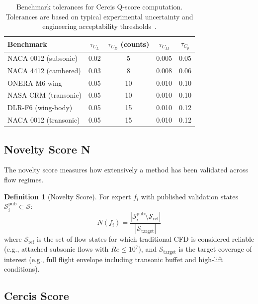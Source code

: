 \documentclass[11pt,a4paper]{article}
\theoremstyle{definition}
\newtheorem{definition}[theorem]{Definition}
\theoremstyle{remark}
\begin{document}
\begin{table}[htbp]
\centering
\caption{Benchmark tolerances for Cercis Q-score computation. Tolerances are based on typical experimental uncertainty and engineering acceptability thresholds~\citep{vassberg2008summary}.}
\label{tab:tolerances}
\begin{tabular}{@{}lcccc@{}}
\toprule
Benchmark & $\tau_{C_L}$ & $\tau_{C_D}$ (counts) & $\tau_{C_M}$ & $\tau_{C_p}$ \\
\midrule
NACA 0012 (subsonic) & 0.02 & 5 & 0.005 & 0.05 \\
NACA 4412 (cambered) & 0.03 & 8 & 0.008 & 0.06 \\
ONERA M6 wing & 0.05 & 10 & 0.010 & 0.10 \\
NASA CRM (transonic) & 0.05 & 10 & 0.010 & 0.10 \\
DLR-F6 (wing-body) & 0.05 & 15 & 0.010 & 0.12 \\
NACA 0012 (transonic) & 0.05 & 15 & 0.010 & 0.12 \\
\bottomrule
\end{tabular}
\end{table}

\subsection{Novelty Score N}

The novelty score measures how extensively a method has been validated across flow regimes.

\begin{definition}[Novelty Score]
For expert $f_i$ with published validation states $\mathcal{S}_i^{\text{pub}} \subset \mathcal{S}$:
\begin{equation}
N(f_i) = \frac{|\mathcal{S}_i^{\text{pub}} \setminus \mathcal{S}_{\text{ref}}|}{|\mathcal{S}_{\text{target}}|}
\label{eq:nscore}
\end{equation}
where $\mathcal{S}_{\text{ref}}$ is the set of flow states for which traditional CFD is considered reliable (e.g., attached subsonic flows with $Re \leq 10^7$), and $\mathcal{S}_{\text{target}}$ is the target coverage of interest (e.g., full flight envelope including transonic buffet and high-lift conditions).
\end{definition}

\subsection{Cercis Score}
\end{document}
